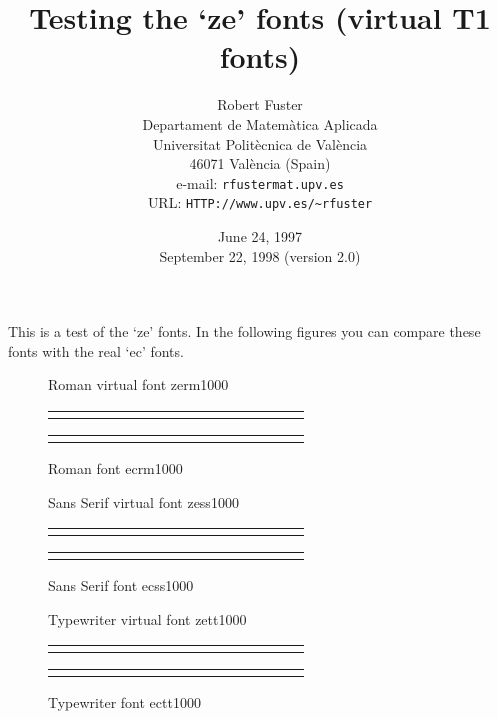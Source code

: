 \documentclass{article}
\title{Testing the `ze' fonts
       (virtual T1 fonts)}
\author{Robert Fuster\\
        \footnotesize Departament de Matem\`atica Aplicada\\
        \footnotesize Universitat Polit\`ecnica de Val\`encia\\
        \footnotesize 46071 Val\`encia (Spain)\\
        \footnotesize e-mail: \texttt{rfuster\@ mat.upv.es}\\
        \footnotesize URL: \texttt{HTTP://www.upv.es/\~{}rfuster}}
\date{June 24, 1997\\
      September 22, 1998 (version 2.0)}
\newcounter{n} \newcounter{p}
\newcommand{\taula}{%
    \setcounter{n}{0}
    \setcounter{p}{0}
    \begin{center}
    \setcounter{n}{0}
    \setcounter{p}{0}
    \begin{tabular}{|c|c|c|c|c|c|c|c|c|c|c|c|c|c|c|c|}
    \hline
    \whiledo{\value{n} < 255}{%
     \symbol{\then}\stepcounter{p}\stepcounter{n}\ifthenelse{\value{p} = 16}{%
                                  \setcounter{p}{0}\\\hline
                                 }{\ifthenelse{\value{n} < 256}{&}{}%
                                     }}
    \symbol{\then}\\\hline
    \end{tabular}
    \end{center}
}
\begin{document}
\maketitle
This is a test of the `ze' fonts. In the following figures you can compare
these fonts with the real `ec' fonts.
\begin{figure}
    \caption{Roman virtual font zerm1000 \label{fig:zerm1000}}
    \taula
    \caption{Roman font ecrm1000 \label{fig:ecrm1000}}
    {\renewcommand{\rmdefault}{cmr}\rmfamily\selectfont\taula
    }
\end{figure}
\begin{figure}
    \caption{Sans Serif virtual font zess1000 \label{fig:zess1000}}
    \sffamily\taula
    \caption{Sans Serif font ecss1000 \label{fig:ecss1000}}
    {\renewcommand{\sfdefault}{cmss}\sffamily\selectfont\taula
    }
\end{figure}
\begin{figure}
    \caption{Typewriter virtual font zett1000 \label{fig:zett1000}}
    \ttfamily\taula
    \caption{Typewriter font ectt1000 \label{fig:ectt1000}}
    {\renewcommand{\ttdefault}{cmtt}\ttfamily\selectfont\taula
    }
\end{figure}
\end{document}
